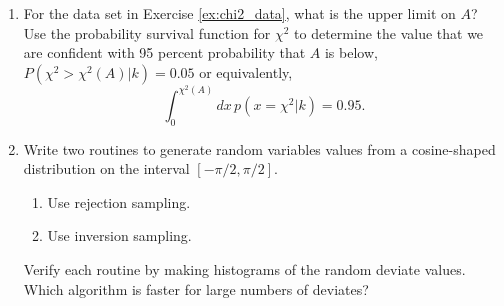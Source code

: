 \begin{enumerate}
\item For the data set in Exercise \ref{ex:chi2_data}, what is the upper limit on $A$?  Use the probability survival function for $\chi^2$ to determine the value  that we are confident with 95 percent probability that $A$ is below, $P(\chi^2 > \chi^2(A)| k) = 0.05$ or equivalently, \begin{equation*} \int_0^{\chi^2(A)} dx\,p(x = \chi^2|k) = 0.95.\end{equation*}

\item Write two routines to generate random variables values from a cosine-shaped distribution on the interval $[-\pi/2,\pi/2]$.
  \begin{enumerate}
  \item Use rejection sampling.
  \item Use inversion sampling.
  \end{enumerate}
Verify each routine by making histograms of the random deviate values.  Which algorithm is faster for large numbers of deviates?


\end{enumerate}
